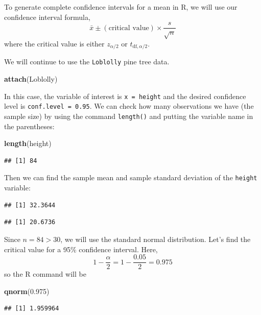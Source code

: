 \documentclass[
]{book}
\newenvironment{Shaded}{\begin{snugshade}}{\end{snugshade}}
\newcommand{\FloatTok}[1]{\textcolor[rgb]{0.00,0.00,0.81}{#1}}
\newcommand{\FunctionTok}[1]{\textcolor[rgb]{0.13,0.29,0.53}{\textbf{#1}}}
\newcommand{\NormalTok}[1]{#1}
\begin{document}
To generate complete confidence intervals for a mean in R, we will use our confidence interval formula, \[\bar{x} \pm (\text{critical value})\times\frac{s}{\sqrt{n}}\] where the critical value is either \(z_{\alpha/2}\) or \(t_{\text{df}, \alpha/2}\).

We will continue to use the \texttt{Loblolly} pine tree data.

\begin{Shaded}
\begin{Highlighting}[]
\FunctionTok{attach}\NormalTok{(Loblolly)}
\end{Highlighting}
\end{Shaded}

In this case, the variable of interest is \texttt{x\ =\ height} and the desired confidence level is \texttt{conf.level\ =\ 0.95}. We can check how many observations we have (the sample size) by using the command \texttt{length()} and putting the variable name in the parentheses:

\begin{Shaded}
\begin{Highlighting}[]
\FunctionTok{length}\NormalTok{(height)}
\end{Highlighting}
\end{Shaded}

\begin{verbatim}
## [1] 84
\end{verbatim}

Then we can find the sample mean and sample standard deviation of the \texttt{height} variable:

\begin{verbatim}
## [1] 32.3644
\end{verbatim}

\begin{verbatim}
## [1] 20.6736
\end{verbatim}

Since \(n = 84 > 30\), we will use the standard normal distribution. Let's find the critical value for a 95\% confidence interval. Here, \[1-\frac{\alpha}{2} = 1 - \frac{0.05}{2} = 0.975\] so the R command will be

\begin{Shaded}
\begin{Highlighting}[]
\FunctionTok{qnorm}\NormalTok{(}\FloatTok{0.975}\NormalTok{)}
\end{Highlighting}
\end{Shaded}

\begin{verbatim}
## [1] 1.959964
\end{verbatim}
\end{document}

